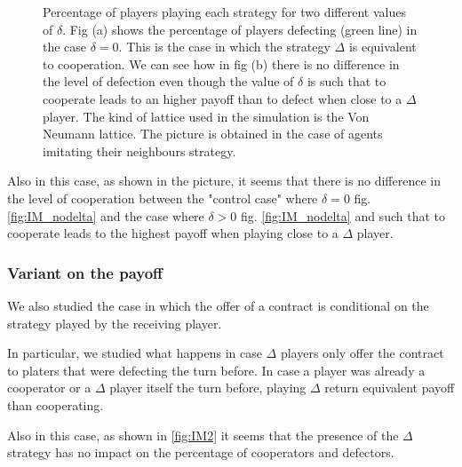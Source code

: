 \documentclass{article}
\begin{document}
\begin{figure}[htbp]
\begin{subfigure}[t]{0.47\textwidth}
  \label{fig:IM_delta} 
\end{subfigure}
\caption{Percentage of players playing each strategy for two different values of $\delta$.
Fig (a) shows the percentage of players defecting (green line) in the case $\delta =0$. This is the case in which the strategy $\Delta$ is equivalent to cooperation.
We can see how in fig (b) there is no difference in the level of defection even though the value of $\delta$ is such that to cooperate leads to an higher payoff than to defect when close to a $\Delta$ player.
The kind of lattice used in the simulation is the Von Neumann lattice.
The picture is obtained in the case of agents imitating their neighbours strategy.
}
\label{fig:IM}
\end{figure} 

Also in this case, as shown in the picture, it seems that there is no difference in the level of cooperation between the "control case" where $\delta=0$ fig. \ref{fig:IM_nodelta} and the case where $\delta>0$  fig. \ref{fig:IM_nodelta} and such that to cooperate leads to the highest payoff when playing close to a $\Delta$ player.

\subsubsection{Variant on the payoff}

We also studied the case in which the offer of a contract is conditional on the strategy played by the receiving player.

In particular, we studied what happens in case $\Delta$ players only offer the contract to platers that were defecting the turn before.
In case a player was already a cooperator or a $\Delta$ player itself the turn before, playing $\Delta$ return equivalent payoff than cooperating.

Also in this case, as shown in \ref{fig:IM2} it seems that the presence of the $\Delta$ strategy has no impact on the percentage of cooperators and defectors.
\end{document}
